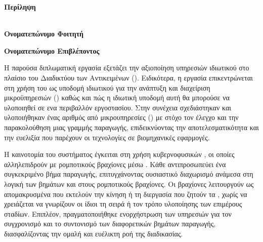 \pagestyle{plain}
\begin{center}
  {\LARGE \textbf{Περίληψη}}\\[1cm]
  \textbf{\doctitle}\\[1cm]
  \begin{minipage}{0.38\textwidth}
    \begin{flushleft}
      \textbf{Ονοματεπώνυμο Φοιτητή}\\
      \textbf{\nommesmall}
    \end{flushleft}
  \end{minipage}
  \begin{minipage}{0.38\textwidth}
    \begin{flushright}
      \textbf{Ονοματεπώνυμο Επιβλέποντος}\\
      \textbf{\supname}
    \end{flushright}
  \end{minipage}
\end{center}

\vspace{10mm}

Η παρούσα διπλωματική εργασία εξετάζει την αξιοποίηση υπηρεσιών ιδιωτικού  στο πλαίσιο του 
Διαδικτύου των Αντικειμένων (). Ειδικότερα, η εργασία επικεντρώνεται στη χρήση του  
ως υποδομή ιδιωτικού  για την ανάπτυξη και διαχείριση μικροϋπηρεσιών () καθώς 
και πώς η ιδιωτική υποδομή αυτή θα μπορούσε να υλοποιηθεί σε ενα περιβαλλόν εργοστασίου. Στην συνέχεια
σχεδιάστηκαν και υλοποιήθηκαν ένας αριθμός από μικρουπηρεσίες () με στόχο τον έλεγχο και την παρακολούθηση
μιας γραμμής παραγωγής, επιδεικνύοντας την αποτελεσματικότητα και την ευελιξία που παρέχουν οι τεχνολογίες  σε 
βιομηχανικές εφαρμογές.

Η καινοτομία του συστήματος έγκειται στη χρήση κυβερνοφυσικών , οι οποίες αλληλεπιδρούν με ρομποτικούς βραχίονες 
μέσω . Κάθε  αντιπροσωπεύει ένα συγκεκριμένο βήμα παραγωγής, επιτυγχάνοντας ουσιαστικό διαχωρισμό  
ανάμεσα στη λογική των βημάτων και στους ρομποτικούς βραχίονες. Οι βραχίονες λειτουργούν ως απομακρυσμένα 
 που εκτελούν την κίνηση ή τη διεργασία που ζητούν τα , χωρίς να χρειάζεται 
να γνωρίζουν οι ίδιοι τη σειρά ή τον τρόπο υλοποίησης των επιμέρους σταδίων. Επιπλέον, πραγματοποιήθηκε ενορχήστρωση 
των υπηρεσιών  για τον συγχρονισμό και το συντονισμό των διαφορετικών βημάτων παραγωγής, 
διασφαλίζοντας την ομαλή και ευέλικτη ροή της διαδικασίας.


